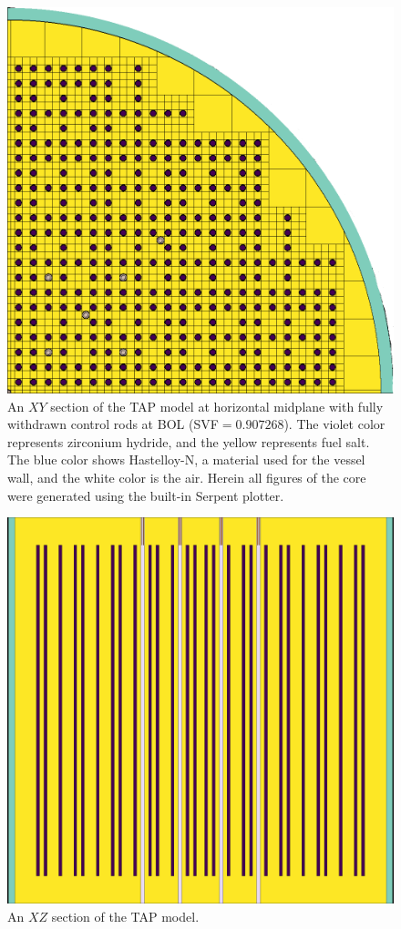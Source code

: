 \documentclass[12pt]{article} %
\begin{document}
\begin{figure}[htp!] %
  \centering
		  \includegraphics[width=\textwidth]{tap_plan_view.png}
  \caption{An $XY$ section of the \gls{TAP} model at horizontal midplane 
  with fully withdrawn control rods at \gls{BOL} (\gls{SVF}$=0.907268$). 
  The violet color represents zirconium 
hydride, and the yellow represents fuel salt. The blue color shows 
Hastelloy-N, a material used for the vessel wall, and the white color 
is the air. Herein all figures of the core 
were generated using the built-in Serpent plotter.}
  \label{fig:tap-serpent-plan}
\end{figure}
\begin{figure}[htp!] %
  \centering
		  \includegraphics[width=\textwidth]{tap_elev_view.png}
  \caption{An $XZ$ section of the \gls{TAP} model.}
  \label{fig:tap-serpent-elev}
\end{figure}
\end{document}
